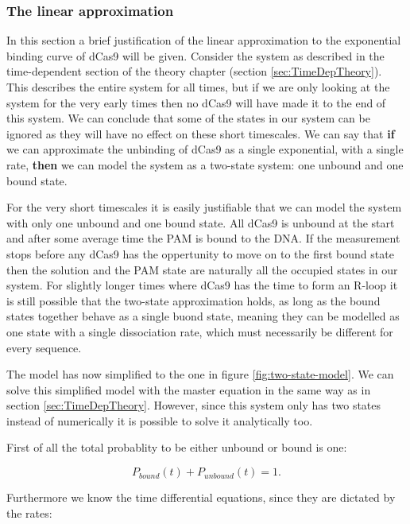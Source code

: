 \subsubsection{The linear approximation}
\label{sec:mathematicaljustificationlinearapprox}

In this section a brief justification of the linear approximation to the exponential binding curve of dCas9 will be given. Consider the system as described in the time-dependent section of the theory chapter (section \ref{sec:TimeDepTheory}). This describes the entire system for all times, but if we are only looking at the system for the very early times then no dCas9 will have made it to the end of this system. We can conclude that some of the states in our system can be ignored as they will have no effect on these short timescales. We can say that \textbf{if} we can approximate the unbinding of dCas9 as a single exponential, with a single rate, \textbf{then} we can model the system as a two-state system: one unbound and one bound state.

For the very short timescales it is easily justifiable that we can model the system with only one unbound and one bound state. All dCas9 is unbound at the start and after some average time the PAM is bound to the DNA. If the measurement stops before any dCas9 has the oppertunity to move on to the first bound state then the solution and the PAM state are naturally all the occupied states in our system. For slightly longer times where dCas9 has the time to form an R-loop it is still possible that the two-state approximation holds, as long as the bound states together behave as a single buond state, meaning they can be modelled as one state with a single dissociation rate, which must necessarily be different for every sequence.

The model has now simplified to the one in figure \ref{fig:two-state-model}. We can solve this simplified model with the master equation in the same way as in section \ref{sec:TimeDepTheory}. However, since this system only has two states instead of numerically it is possible to solve it analytically too.

First of all the total probablity to be either unbound or bound is one:

\begin{equation}
P_{bound}(t) + P_{unbound}(t) = 1.
\label{eq:sumPboundPunbound}
\end{equation}

Furthermore we know the time differential equations, since they are dictated by the rates:

